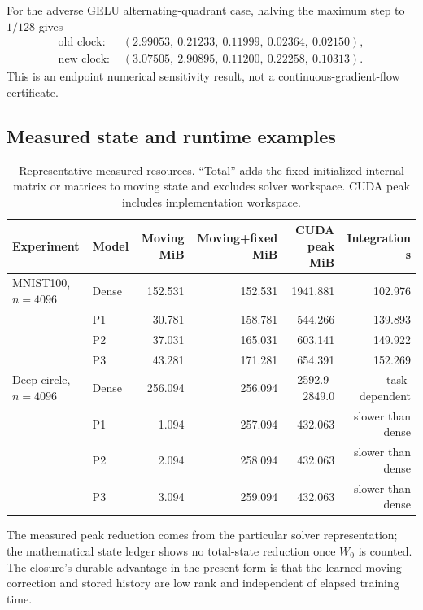 For the adverse GELU alternating-quadrant case, halving the maximum step to
$1/128$ gives
\begin{align*}
\text{old clock: }&(2.99053,\ 0.21233,\ 0.11999,\ 0.02364,\ 0.02150),\\
\text{new clock: }&(3.07505,\ 2.90895,\ 0.11200,\ 0.22258,\ 0.10313).
\end{align*}
This is an endpoint numerical sensitivity result, not a
continuous-gradient-flow certificate.

\subsection{Measured state and runtime examples}

\begin{table}[h]
\centering
\scriptsize
\caption{Representative measured resources.  ``Total'' adds the fixed
initialized internal matrix or matrices to moving state and excludes solver
workspace.  CUDA peak includes implementation workspace.}
\label{tab:resource-full}
\begin{tabular}{@{}llrrrr@{}}
\toprule
Experiment & Model & Moving MiB & Moving+fixed MiB & CUDA peak MiB & Integration s\\
\midrule
MNIST100, $n=4096$ & Dense & 152.531 & 152.531 & 1941.881 & 102.976\\
& P1 & 30.781 & 158.781 & 544.266 & 139.893\\
& P2 & 37.031 & 165.031 & 603.141 & 149.922\\
& P3 & 43.281 & 171.281 & 654.391 & 152.269\\
\midrule
Deep circle, $n=4096$ & Dense & 256.094 & 256.094 & 2592.9--2849.0 & task-dependent\\
& P1 & 1.094 & 257.094 & 432.063 & slower than dense\\
& P2 & 2.094 & 258.094 & 432.063 & slower than dense\\
& P3 & 3.094 & 259.094 & 432.063 & slower than dense\\
\bottomrule
\end{tabular}
\end{table}

The measured peak reduction comes from the particular solver representation;
the mathematical state ledger shows no total-state reduction once $W_0$ is
counted.  The closure's durable advantage in the present form is that the
learned moving correction and stored history are low rank and independent of
elapsed training time.
